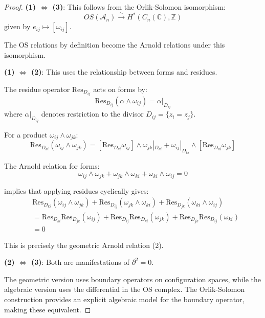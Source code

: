 \begin{proof}
\textbf{(1) $\Leftrightarrow$ (3)}: This follows from the Orlik-Solomon isomorphism:
\begin{equation}
OS(\mathcal{A}_n) \xrightarrow{\sim} H^*(C_n(\mathbb{C}), \mathbb{Z})
\end{equation}
given by $e_{ij} \mapsto [\omega_{ij}]$.

The OS relations by definition become the Arnold relations under this isomorphism.

\textbf{(1) $\Leftrightarrow$ (2)}: This uses the relationship between forms and residues.

The residue operator $\text{Res}_{D_{ij}}$ acts on forms by:
\begin{equation}
\text{Res}_{D_{ij}}(\alpha \wedge \omega_{ij}) = \alpha|_{D_{ij}}
\end{equation}
where $\alpha|_{D_{ij}}$ denotes restriction to the divisor $D_{ij} = \{z_i = z_j\}$.

For a product $\omega_{ij} \wedge \omega_{jk}$:
\begin{equation}
\text{Res}_{D_{ki}}(\omega_{ij} \wedge \omega_{jk}) = \left[\text{Res}_{D_{ki}} 
\omega_{ij}\right] \wedge \omega_{jk}|_{D_{ki}} + \omega_{ij}|_{D_{ki}} \wedge 
\left[\text{Res}_{D_{ki}} \omega_{jk}\right]
\end{equation}

The Arnold relation for forms:
\begin{equation}
\omega_{ij} \wedge \omega_{jk} + \omega_{jk} \wedge \omega_{ki} + \omega_{ki} \wedge 
\omega_{ij} = 0
\end{equation}

implies that applying residues cyclically gives:
\begin{align}
&\text{Res}_{D_{ki}}(\omega_{ij} \wedge \omega_{jk}) + \text{Res}_{D_{ij}}(\omega_{jk} 
\wedge \omega_{ki}) + \text{Res}_{D_{jk}}(\omega_{ki} \wedge \omega_{ij})\\
&= \text{Res}_{D_{ki}} \text{Res}_{D_{jk}}(\omega_{ij}) + \text{Res}_{D_{ij}} 
\text{Res}_{D_{ki}}(\omega_{jk}) + \text{Res}_{D_{jk}} \text{Res}_{D_{ij}}(\omega_{ki})\\
&= 0
\end{align}

This is precisely the geometric Arnold relation (2).

\textbf{(2) $\Leftrightarrow$ (3)}: Both are manifestations of $\partial^2 = 0$.

The geometric version uses boundary operators on configuration spaces, while the 
algebraic version uses the differential in the OS complex. The Orlik-Solomon construction 
provides an explicit algebraic model for the boundary operator, making these equivalent.
\end{proof}

